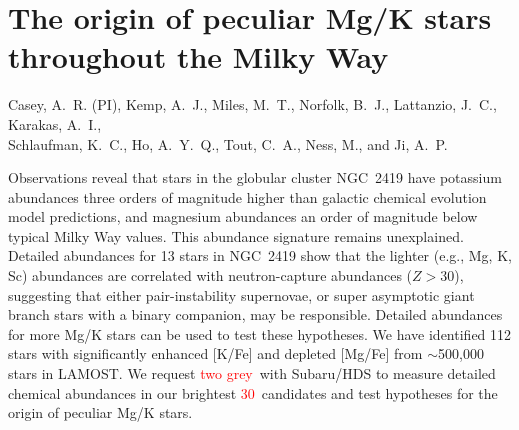 \documentclass[12pt]{report}
\newcommand{\todo}[1]{\textcolor{red}{#1}}
\newcommand{\NumStars}{\todo{30}}
\newcommand{\NumNights}{\todo{two grey}}
\begin{document}
\section*{The origin of peculiar Mg/K stars throughout the Milky Way}\vspace{-\parskip}

\begin{center}
Casey, A.~R. (PI), Kemp, A.~J., Miles, M.~T., Norfolk, B.~J., Lattanzio, J.~C., Karakas, A.~I.,\\ Schlaufman, K.~C., Ho, A.~Y.~Q., Tout, C.~A., Ness, M., and Ji, A.~P.
\end{center}

\newcommand{\refnum}[1]{[#1]}

\begin{highlightbox}
Observations reveal that stars in the globular cluster NGC~2419 have potassium abundances three orders of magnitude higher than galactic chemical evolution model predictions, and magnesium abundances an order of magnitude below typical Milky Way values. This abundance signature remains unexplained. Detailed abundances for 13 stars in NGC~2419 show that the lighter (e.g., Mg, K, Sc) abundances are correlated with neutron-capture abundances ($Z > 30$), suggesting that either pair-instability supernovae, or super asymptotic giant branch stars with a binary companion, may be responsible. Detailed abundances for more Mg/K stars can be used to test these hypotheses. We have identified 112 stars with significantly enhanced [K/Fe] and depleted [Mg/Fe] from $\sim$500,000 stars in LAMOST. We request \NumNights\ with Subaru/HDS to measure detailed chemical abundances in our brightest \NumStars\ candidates and test hypotheses for the origin of peculiar Mg/K stars.
\end{highlightbox}\vspace{-\parskip}
\end{document}
